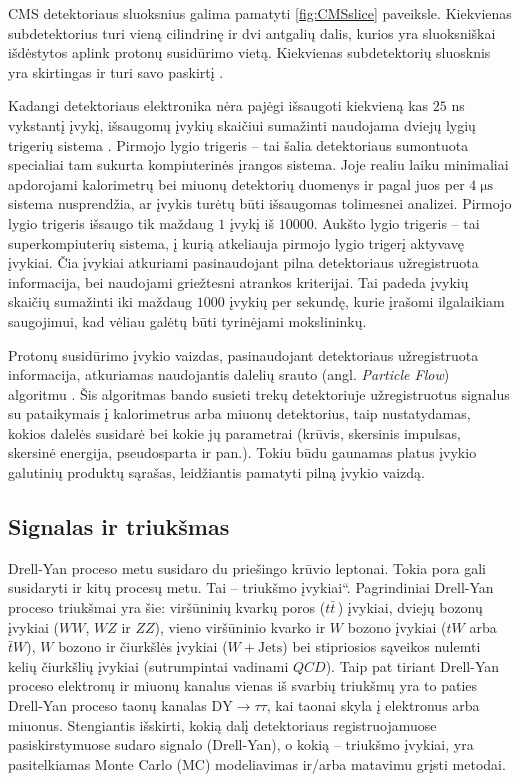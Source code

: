 \documentclass[a4paper, 12pt, twoside]{article}
\newcommand{\WJets}{W\! +\!\mathrm{Jets}}
\newcommand{\DYtau}{\mathrm{DY} \! \rightarrow \! \tau\tau}
\newcommand{\ltq}[1]{{\quotedblbase{}#1\textquotedblleft{}}}
\newcommand{\QCD}{QC\! D}
\newlength\q
\begin{document}
CMS detektoriaus sluoksnius galima pamatyti \ref{fig:CMSslice} paveiksle.
Kiekvienas subdetektorius turi vieną cilindrinę ir dvi antgalių dalis, kurios yra sluoksniškai išdėstytos
aplink protonų susidūrimo vietą.
Kiekvienas subdetektorių sluosknis yra skirtingas ir turi savo paskirtį \cite{CMSexperiment}.

Kadangi detektoriaus elektronika nėra pajėgi išsaugoti kiekvieną kas $25$ ns vykstantį įvykį, išsaugomų
įvykių skaičiui sumažinti naudojama dviejų lygių trigerių sistema \cite{CMStrig}.
Pirmojo lygio trigeris -- tai šalia detektoriaus sumontuota specialiai tam sukurta kompiuterinės
įrangos sistema.
Joje realiu laiku minimaliai apdorojami kalorimetrų bei miuonų detektorių duomenys ir pagal juos per
$4 \; \mathrm{\mu s}$ sistema nusprendžia, ar įvykis turėtų būti išsaugomas tolimesnei analizei. 
Pirmojo lygio trigeris išsaugo tik maždaug $1$ įvykį iš $10000$.
Aukšto lygio trigeris -- tai superkompiuterių sistema, į kurią atkeliauja pirmojo lygio trigerį
aktyvavę įvykiai.
Čia įvykiai atkuriami pasinaudojant pilna detektoriaus užregistruota informacija, bei naudojami
griežtesni atrankos kriterijai.
Tai padeda įvykių skaičių sumažinti iki maždaug $1000$ įvykių per sekundę, kurie įrašomi ilgalaikiam saugojimui,
kad vėliau galėtų būti tyrinėjami mokslininkų.

Protonų susidūrimo įvykio vaizdas, pasinaudojant detektoriaus užregistruota informacija, atkuriamas naudojantis
dalelių srauto (angl. \textit{Particle Flow}) algoritmu \cite{ParticleFlow}.
Šis algoritmas bando susieti trekų detektoriuje užregistruotus signalus su pataikymais į kalorimetrus arba miuonų
detektorius, taip nustatydamas, kokios dalelės susidarė bei kokie jų parametrai (krūvis, skersinis impulsas,
skersinė energija, pseudosparta ir pan.).
Tokiu būdu gaunamas platus įvykio galutinių produktų sąrašas, leidžiantis pamatyti pilną įvykio vaizdą.

\subsection{Signalas ir triukšmas}

Drell-Yan proceso metu susidaro du priešingo krūvio leptonai.
Tokia pora gali susidaryti ir kitų procesų metu.
Tai -- \ltq{triukšmo įvykiai}.
Pagrindiniai Drell-Yan proceso triukšmai yra šie: viršūninių kvarkų poros ($t\bar{t}\,$) įvykiai, dviejų bozonų
įvykiai ($WW$, $WZ$ ir $ZZ$), vieno viršūninio kvarko ir $W$ bozono įvykiai ($tW$ arba $\bar{t}W$), $W$ bozono
ir čiurkšlės įvykiai ($\WJets$) bei stipriosios sąveikos nulemti kelių čiurkšlių įvykiai (sutrumpintai vadinami $\QCD$).
Taip pat tiriant Drell-Yan proceso elektronų ir miuonų kanalus vienas iš svarbių triukšmų yra
to paties Drell-Yan proceso taonų kanalas $\DYtau$, kai taonai skyla į elektronus arba miuonus.
Stengiantis išskirti, kokią dalį detektoriaus registruojamuose pasiskirstymuose sudaro signalo (Drell-Yan),
o kokią -- triukšmo įvykiai, yra pasitelkiamas Monte Carlo (MC) modeliavimas ir/arba matavimu grįsti metodai.
\end{document}
